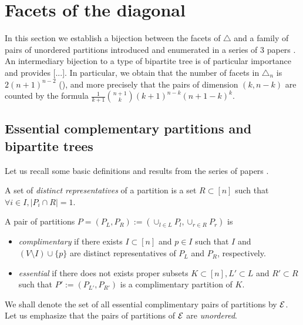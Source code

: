 
\section{Facets of the diagonal} 
\label{s:facets}

In this section we establish a bijection between the facets of $\triangle$ and a family of pairs of unordered partitions introduced and enumerated in a series of 3 papers \cite{chen1969computer,chen1971tables,kajitani1982number}. An intermediary bijection to a type of bipartite tree is of particular importance and provides [...].
In particular, we obtain that the number of facets in $\triangle_n$ is $2(n+1)^{n-2}$ (), and more precisely that the pairs of dimension $(k,n-k)$ are counted by the formula $\frac{1}{k+1}\binom{n+1}{k}(k+1)^{n-k}(n+1-k)^{k}$. 


\subsection{Essential complementary partitions and bipartite trees}
Let us recall some basic definitions and results from the series of papers \cite{chen1969computer,chen1971tables,kajitani1982number}.

\begin{definition}
A set of \emph{distinct representatives} of a partition is a set $R\subset [n]$ such that $\forall i \in I,|P_i \cap R| = 1$.
\end{definition}

\begin{definition}
A pair of partitions $P=(P_L,P_R):=(\cup_{l\in L} P_l , \cup_{r\in R} P_r)$ is
\begin{itemize}
    \item \emph{complimentary} if there exists $I\subset [n]$ and $p \in I$ such that $I$ and $(V\setminus I) \cup \{p\}$ are distinct representatives of $P_L$ and $P_R$, respectively.
    \item \emph{essential} if there does not exists proper subsets $K \subset [n], L'\subset L$ and $R'\subset R$ such that $P':=(P_{L'},P_{R'})$ is a complimentary partition of $K$.
\end{itemize}
\end{definition}

We shall denote the set of all essential complimentary pairs of partitions by $\mathcal{E}$.
Let us emphasize that the pairs of partitions of $\mathcal{E}$ are \emph{unordered}.

